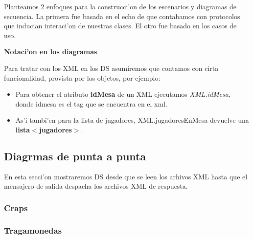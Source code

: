 Planteamos 2 enfoques para la construcci'on de los escenarios y diagramas de secuencia. La primera 
fue basada en el echo de que contabamos con protocolos que inducian interaci'on de
nuestras clases. El otro fue basado en los casos de uso.

\textbf{Notaci'on en los diagramas}

Para tratar con los XML en los DS asumiremos que contamos con cirta funcionalidad, provista por los objetos, por ejemplo:
\begin{itemize}
\item  Para obtener el atributo \textbf{idMesa} de un XML ejecutamos \textit{XML.idMesa}, donde idmesa es el tag que se encuentra en el xml.
\item As'i tambi'en para la lista de jugadores, XML.jugadoresEnMesa devuelve una \textbf{lista$<$jugadores$>$}.
\end{itemize}






\subsection{Diagrmas de punta a punta}
En esta secci'on mostraremos DS desde que se leen los arhivos XML hasta que el mensajero de salida despacha los archivos
XML de respuesta.

\subsubsection{Craps}


\subsubsection{Tragamonedas}



